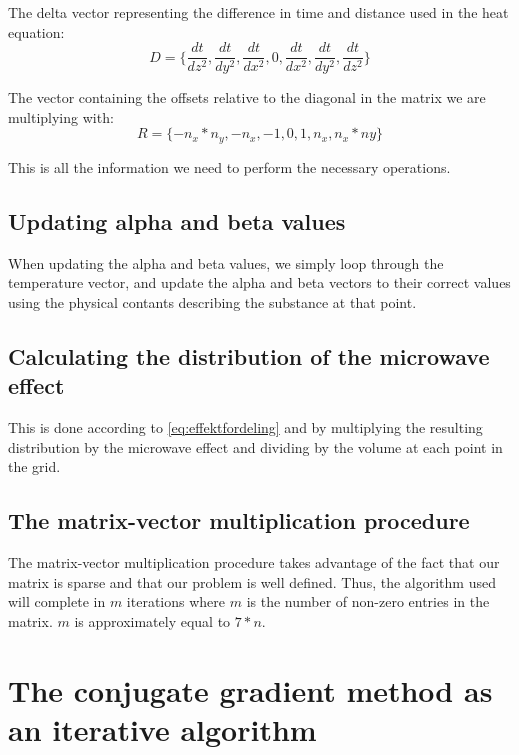 The delta vector representing the difference in time and distance used in the heat
equation:
\begin{equation}
D = \{ \frac{dt}{dz^2}, \frac{dt}{dy^2}, \frac{dt}{dx^2}, 0, \frac{dt}{dx^2}, \frac{dt}{dy^2}, \frac{dt}{dz^2} \}
\end{equation}

The vector containing the offsets relative to the diagonal in the matrix we are multiplying
with:
\begin{equation}
R = \{ -n_x*n_y, -n_x, -1, 0, 1, n_x, n_x*ny \}
\end{equation}

This is all the information we need to perform the necessary operations.

\subsection{Updating alpha and beta values}

When updating the alpha and beta values, we simply loop through the temperature
vector, and update the alpha and beta vectors to their correct values using the
physical contants describing the substance at that point.

\subsection{Calculating the distribution of the microwave effect}

This is done according to \cref{eq:effektfordeling} and by multiplying the
resulting distribution by the microwave effect and dividing by the volume at each point
in the grid.

\subsection{The matrix-vector multiplication procedure}

The matrix-vector multiplication procedure takes advantage of the fact that our 
matrix is sparse and that our problem is well defined. Thus, the algorithm used
will complete in $m$ iterations where $m$ is the number of non-zero entries in 
the matrix. $m$ is approximately equal to $7*n$.

\section{The conjugate gradient method as an iterative algorithm}

